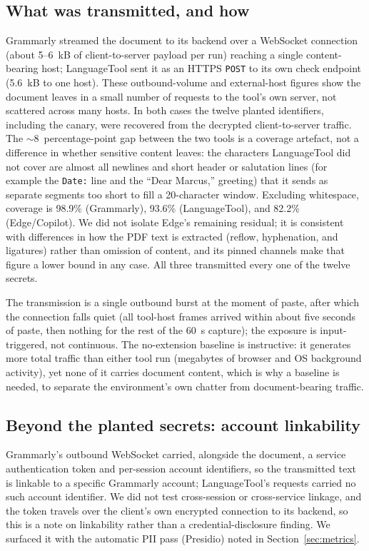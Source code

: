 \documentclass[10pt,conference,a4paper]{IEEEtran}
\begin{document}
\subsection{What was transmitted, and how}

Grammarly streamed the document to its backend over a WebSocket connection (about 5--6~kB of
client-to-server payload per run) reaching a single content-bearing host; LanguageTool sent
it as an HTTPS \texttt{POST} to its own check endpoint (5.6~kB to one host). These
outbound-volume and external-host figures show the document leaves in a small number of
requests to the tool's own server, not scattered across many hosts. In both cases the twelve
planted identifiers,
including the canary, were recovered from the decrypted client-to-server traffic. The
$\sim$8~percentage-point gap between the two tools is a coverage artefact, not a difference
in whether sensitive content leaves: the characters LanguageTool did not cover are almost
all newlines and short header or salutation lines (for example the \texttt{Date:} line and
the ``Dear Marcus,'' greeting) that it sends as separate segments too short to fill a
20-character window. Excluding whitespace, coverage is 98.9\% (Grammarly), 93.6\%
(LanguageTool), and 82.2\% (Edge/Copilot). We did not isolate Edge's remaining residual; it
is consistent with differences in how the PDF text is extracted (reflow, hyphenation, and
ligatures) rather than omission of content, and its pinned channels make that figure a lower
bound in any case. All three transmitted every one of the twelve secrets.

The transmission is a single outbound burst at the moment of paste, after which the
connection falls quiet (all tool-host frames arrived within about five seconds of paste,
then nothing for the rest of the 60~s capture); the exposure is input-triggered, not
continuous. The no-extension baseline is instructive: it generates more total traffic than
either tool run (megabytes of browser and OS background activity), yet none of it carries
document content, which is why a baseline is needed, to separate the environment's own
chatter from document-bearing traffic.

\subsection{Beyond the planted secrets: account linkability}

Grammarly's outbound WebSocket carried, alongside the document, a service authentication
token and per-session account identifiers, so the transmitted text is linkable to a
specific Grammarly account; LanguageTool's requests carried no such account identifier. We
did not test cross-session or cross-service linkage, and the token travels over the
client's own encrypted connection to its backend, so this is a note on linkability rather
than a credential-disclosure finding. We surfaced it with the automatic PII pass (Presidio)
noted in Section~\ref{sec:metrics}.
\end{document}
